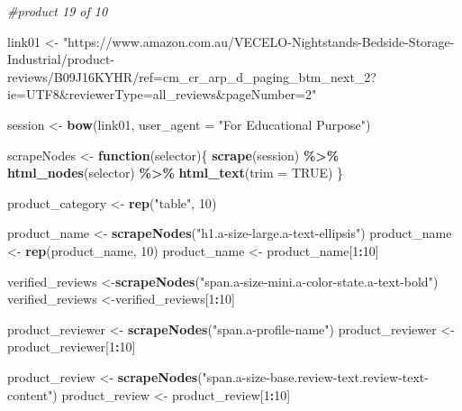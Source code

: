 \documentclass[
]{article}
\newenvironment{Shaded}{\begin{snugshade}}{\end{snugshade}}
\newcommand{\AttributeTok}[1]{\textcolor[rgb]{0.13,0.29,0.53}{#1}}
\newcommand{\CommentTok}[1]{\textcolor[rgb]{0.56,0.35,0.01}{\textit{#1}}}
\newcommand{\ConstantTok}[1]{\textcolor[rgb]{0.56,0.35,0.01}{#1}}
\newcommand{\ControlFlowTok}[1]{\textcolor[rgb]{0.13,0.29,0.53}{\textbf{#1}}}
\newcommand{\DecValTok}[1]{\textcolor[rgb]{0.00,0.00,0.81}{#1}}
\newcommand{\FunctionTok}[1]{\textcolor[rgb]{0.13,0.29,0.53}{\textbf{#1}}}
\newcommand{\NormalTok}[1]{#1}
\newcommand{\OtherTok}[1]{\textcolor[rgb]{0.56,0.35,0.01}{#1}}
\newcommand{\SpecialCharTok}[1]{\textcolor[rgb]{0.81,0.36,0.00}{\textbf{#1}}}
\newcommand{\StringTok}[1]{\textcolor[rgb]{0.31,0.60,0.02}{#1}}
\begin{document}
\begin{Shaded}
\begin{Highlighting}[]
\CommentTok{\#product 19 of 10}

\NormalTok{link01 }\OtherTok{\textless{}{-}} \StringTok{"https://www.amazon.com.au/VECELO{-}Nightstands{-}Bedside{-}Storage{-}Industrial/product{-}reviews/B09J16KYHR/ref=cm\_cr\_arp\_d\_paging\_btm\_next\_2?ie=UTF8\&reviewerType=all\_reviews\&pageNumber=2"}


\NormalTok{  session }\OtherTok{\textless{}{-}} \FunctionTok{bow}\NormalTok{(link01,}
               \AttributeTok{user\_agent =} \StringTok{"For Educational Purpose"}\NormalTok{)}

\NormalTok{  scrapeNodes }\OtherTok{\textless{}{-}} \ControlFlowTok{function}\NormalTok{(selector)\{}
    \FunctionTok{scrape}\NormalTok{(session) }\SpecialCharTok{\%\textgreater{}\%}
      \FunctionTok{html\_nodes}\NormalTok{(selector) }\SpecialCharTok{\%\textgreater{}\%}
      \FunctionTok{html\_text}\NormalTok{(}\AttributeTok{trim =} \ConstantTok{TRUE}\NormalTok{)}
\NormalTok{  \}}

\NormalTok{  product\_category }\OtherTok{\textless{}{-}} \FunctionTok{rep}\NormalTok{(}\StringTok{"table"}\NormalTok{, }\DecValTok{10}\NormalTok{)}

\NormalTok{  product\_name }\OtherTok{\textless{}{-}} \FunctionTok{scrapeNodes}\NormalTok{(}\StringTok{"h1.a{-}size{-}large.a{-}text{-}ellipsis"}\NormalTok{)}
\NormalTok{  product\_name }\OtherTok{\textless{}{-}} \FunctionTok{rep}\NormalTok{(product\_name, }\DecValTok{10}\NormalTok{)}
\NormalTok{  product\_name }\OtherTok{\textless{}{-}}\NormalTok{ product\_name[}\DecValTok{1}\SpecialCharTok{:}\DecValTok{10}\NormalTok{]}
  
\NormalTok{  verified\_reviews }\OtherTok{\textless{}{-}}\FunctionTok{scrapeNodes}\NormalTok{(}\StringTok{"span.a{-}size{-}mini.a{-}color{-}state.a{-}text{-}bold"}\NormalTok{)}
\NormalTok{  verified\_reviews }\OtherTok{\textless{}{-}}\NormalTok{verified\_reviews[}\DecValTok{1}\SpecialCharTok{:}\DecValTok{10}\NormalTok{]}
  
\NormalTok{  product\_reviewer }\OtherTok{\textless{}{-}} \FunctionTok{scrapeNodes}\NormalTok{(}\StringTok{"span.a{-}profile{-}name"}\NormalTok{)}
\NormalTok{  product\_reviewer }\OtherTok{\textless{}{-}}\NormalTok{ product\_reviewer[}\DecValTok{1}\SpecialCharTok{:}\DecValTok{10}\NormalTok{]}
  
\NormalTok{  product\_review }\OtherTok{\textless{}{-}} \FunctionTok{scrapeNodes}\NormalTok{(}\StringTok{"span.a{-}size{-}base.review{-}text.review{-}text{-}content"}\NormalTok{)}
\NormalTok{  product\_review }\OtherTok{\textless{}{-}}\NormalTok{ product\_review[}\DecValTok{1}\SpecialCharTok{:}\DecValTok{10}\NormalTok{]}
  

\end{Highlighting}
\end{Shaded}
\end{document}
